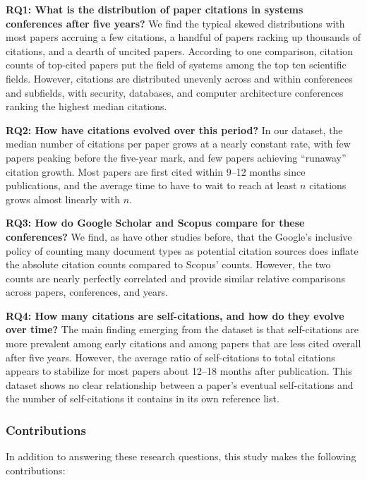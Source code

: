 \documentclass{article}
\begin{document}
\textbf{RQ1: What is the distribution of paper citations in systems conferences after five years?}
We find the typical skewed distributions with most papers accruing a few citations, a handful of papers racking up thousands of citations, and a dearth of uncited papers. According to one comparison, citation counts of top-cited papers put the field of systems among the top ten scientific fields. However, citations are distributed unevenly across and within conferences and subfields, with security, databases, and computer architecture conferences ranking the highest median citations.

\textbf{RQ2: How have citations evolved over this period?}
In our dataset, the median number of citations per paper grows at a nearly constant rate, with few papers peaking before the five-year mark, and few papers achieving ``runaway'' citation growth.
Most papers are first cited within 9--12 months since publications, and the average time to have to wait to reach at least \(n\) citations grows almost linearly with \(n\).

\textbf{RQ3: How do Google Scholar and Scopus compare for these conferences?}
We find, as have other studies before, that the Google's inclusive policy of counting many document types as potential citation sources does inflate the absolute citation counts compared to Scopus' counts.
However, the two counts are nearly perfectly correlated and provide similar relative comparisons across papers, conferences, and years.

\textbf{RQ4: How many citations are self-citations, and how do they evolve over time?}
The main finding emerging from the dataset is that self-citations are more prevalent among early citations and among papers that are less cited overall after five years.
However, the average ratio of self-citations to total citations appears to stabilize for most papers about 12--18 months after publication.
This dataset shows no clear relationship between a paper's eventual self-citations and the number of self-citations it contains in its own reference list.

\hypertarget{contributions}{%
\subsubsection*{Contributions}\label{contributions}}

In addition to answering these research questions, this study makes the following contributions:
\end{document}
